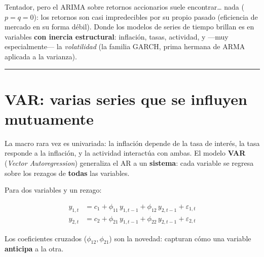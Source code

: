 \documentclass[
  spanish,
  letterpaper,
  DIV=11,
  numbers=noendperiod]{scrreprt}
\begin{document}
\begin{tcolorbox}[enhanced jigsaw, bottomrule=.15mm, colback=white, opacitybacktitle=0.6, arc=.35mm, toprule=.15mm, opacityback=0, breakable, titlerule=0mm, left=2mm, coltitle=black, colbacktitle=quarto-callout-warning-color!10!white, colframe=quarto-callout-warning-color-frame, leftrule=.75mm, toptitle=1mm, bottomtitle=1mm, title=\textcolor{quarto-callout-warning-color}{\faExclamationTriangle}\hspace{0.5em}{¿Y pronosticar retornos de acciones?}, rightrule=.15mm]

Tentador, pero el ARIMA sobre retornos accionarios suele
encontrar\ldots{} nada (\(p = q = 0\)): los retornos son casi
impredecibles por su propio pasado (eficiencia de mercado en su forma
débil). Donde los modelos de series de tiempo brillan es en variables
\textbf{con inercia estructural}: inflación, tasas, actividad, y ---muy
especialmente--- la \emph{volatilidad} (la familia GARCH, prima hermana
de ARMA aplicada a la varianza).

\end{tcolorbox}

\begin{center}\rule{0.5\linewidth}{0.5pt}\end{center}

\chapter{VAR: varias series que se influyen
mutuamente}\label{var-varias-series-que-se-influyen-mutuamente}

La macro rara vez es univariada: la inflación depende de la tasa de
interés, la tasa responde a la inflación, y la actividad interactúa con
ambas. El modelo \textbf{VAR} (\emph{Vector Autoregression}) generaliza
el AR a un \textbf{sistema}: cada variable se regresa sobre los rezagos
de \textbf{todas} las variables.

Para dos variables y un rezago:

\[\begin{aligned} y_{1,t} &= c_1 + \phi_{11}\, y_{1,t-1} + \phi_{12}\, y_{2,t-1} + \varepsilon_{1,t} \\ y_{2,t} &= c_2 + \phi_{21}\, y_{1,t-1} + \phi_{22}\, y_{2,t-1} + \varepsilon_{2,t} \end{aligned}\]

Los coeficientes cruzados (\(\phi_{12}, \phi_{21}\)) son la novedad:
capturan cómo una variable \textbf{anticipa} a la otra.
\end{document}
